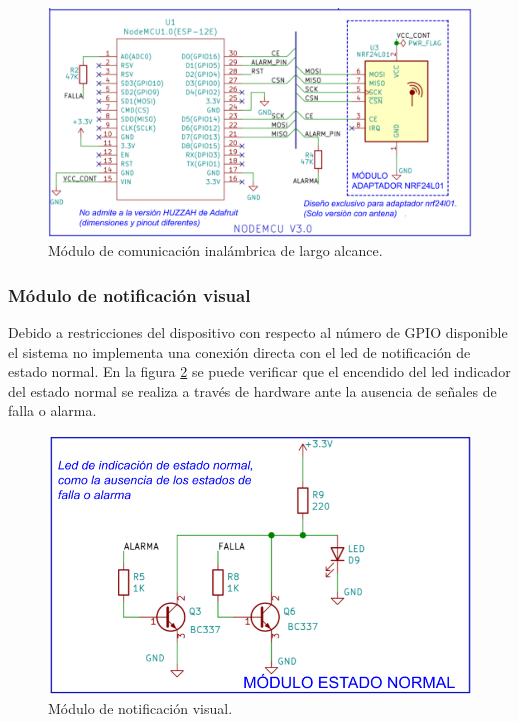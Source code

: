 \begin{figure}[]
	\centering
	\includegraphics[scale=.3]{./Figures/Capitulo3/Fig_J3.png}
	\caption{Módulo de comunicación inalámbrica de largo alcance.}
	\label{fig:figura_j3}
\end{figure} 


\subsubsection{Módulo de notificación visual}

Debido a restricciones del dispositivo con respecto al número de GPIO disponible el sistema no implementa una conexión directa con el led de notificación de estado normal. En la figura \ref{fig:figura_k3} se puede verificar que el encendido del led indicador del estado normal se realiza a través de hardware ante la ausencia de señales de falla o alarma.

\begin{figure}[]
	\centering
	\includegraphics[scale=.35]{./Figures/Capitulo3/Fig_K3.png}
	\caption{Módulo de notificación visual.}
	\label{fig:figura_k3}
\end{figure} 


